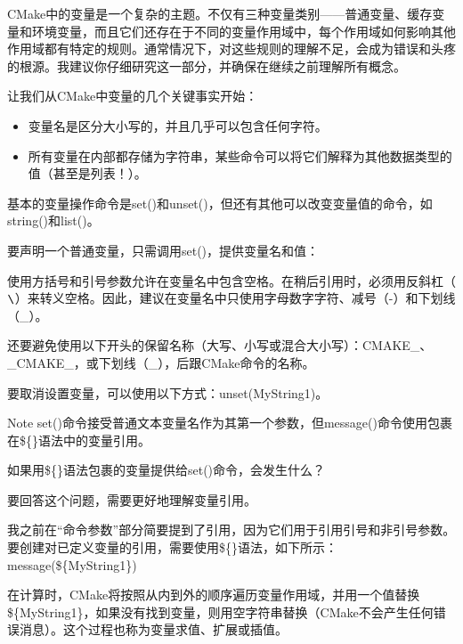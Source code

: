 
CMake中的变量是一个复杂的主题。不仅有三种变量类别——普通变量、缓存变量和环境变量，而且它们还存在于不同的变量作用域中，每个作用域如何影响其他作用域都有特定的规则。通常情况下，对这些规则的理解不足，会成为错误和头疼的根源。我建议你仔细研究这一部分，并确保在继续之前理解所有概念。

让我们从CMake中变量的几个关键事实开始：

\begin{itemize}
\item
变量名是区分大小写的，并且几乎可以包含任何字符。

\item
所有变量在内部都存储为字符串，某些命令可以将它们解释为其他数据类型的值（甚至是列表！）。
\end{itemize}

基本的变量操作命令是set()和unset()，但还有其他可以改变变量值的命令，如string()和list()。

要声明一个普通变量，只需调用set()，提供变量名和值：



使用方括号和引号参数允许在变量名中包含空格。在稍后引用时，必须用反斜杠（$ \verb|\|$）来转义空格。因此，建议在变量名中只使用字母数字字符、减号（-）和下划线（\_）。

还要避免使用以下开头的保留名称（大写、小写或混合大小写）：CMAKE\_、\_CMAKE\_，或下划线（\_），后跟CMake命令的名称。

要取消设置变量，可以使用以下方式：unset(MyString1)。

\begin{myNotic}{Note}
set()命令接受普通文本变量名作为其第一个参数，但message()命令使用包裹在\$\{\}语法中的变量引用。
\end{myNotic}

如果用\$\{\}语法包裹的变量提供给set()命令，会发生什么？

要回答这个问题，需要更好地理解变量引用。


我之前在“命令参数”部分简要提到了引用，因为它们用于引用引号和非引号参数。要创建对已定义变量的引用，需要使用\$\{\}语法，如下所示：message(\$\{MyString1\})

在计算时，CMake将按照从内到外的顺序遍历变量作用域，并用一个值替换\$\{MyString1\}，如果没有找到变量，则用空字符串替换（CMake不会产生任何错误消息）。这个过程也称为变量求值、扩展或插值。

